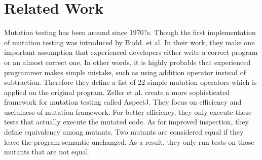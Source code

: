 \section{Related Work}
Mutation testing has been around since 1970?s. Though the first implementation of mutation testing was introduced by Budd. et al. In their work, they make one important assumption that experienced developers either write a correct program or an almost correct one. In other words, it is highly probable that experienced programmer makes simple mistake, such as using addition operator instead of subtraction. Therefore they define a list of 22 simple mutation operators which is applied on the original program. 
Zeller et al. create a more sophisticated framework for mutation testing called AspectJ. They focus on efficiency and usefulness of mutation framework. For better efficiency, they only execute those tests that actually execute the mutated code. As for improved inspection, they define equivalency among mutants. Two mutants are considered equal if they leave the program semantic unchanged. As a result, they only run tests on those mutants that are not equal. 